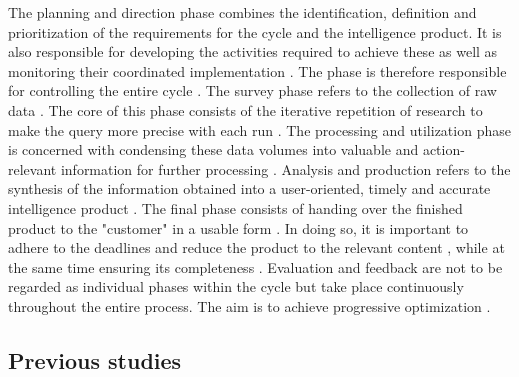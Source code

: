 \documentclass[10pt]{article}
\begin{document}
The planning and direction phase combines the identification, definition and prioritization
of the requirements for the cycle and the intelligence product. It is also responsible for
developing the activities required to achieve these \cite{DepartmentoftheArmy.2012} as well
as monitoring their coordinated implementation
\cite{JointChiefsofStaffU.S.Army.2013, DepartmentoftheArmy.2012}. The phase is therefore
responsible for controlling the entire cycle \cite{CentralIntelligenceAgency.1987}.
The survey phase refers to the collection of raw data \cite{CentralIntelligenceAgency.1987}.
The core of this phase consists of the iterative repetition of research
\cite{NorthAtlanticTreatyOrganization.2001} to make the query more precise with each run
\cite{PastorGalindo.2020}. The processing and utilization phase is concerned with condensing
these data volumes into valuable and action-relevant information for further processing
\cite{DirectorofNationalIntelligence.2011, JointChiefsofStaffU.S.Army.2013, PastorGalindo.2020, }.
Analysis and production refers to the synthesis of the information obtained into a
user-oriented, timely and accurate intelligence product
\cite{DepartmentoftheArmy.2012, Hwang.2022, NorthAtlanticTreatyOrganization.2001}.
The final phase consists of handing over the finished product to the "customer" in a
usable form \cite{CentralIntelligenceAgency.2023, DepartmentoftheArmy.2012, Williams.2018}.
In doing so, it is important to adhere to the deadlines and reduce the product to the
relevant content \cite{DepartmentoftheArmy.2012}, while at the same time ensuring its
completeness \cite{Lowenthal.2020}. Evaluation and feedback are not to be regarded as
individual phases within the cycle but take place continuously throughout the entire process.
The aim is to achieve progressive optimization
\cite{DirectorofNationalIntelligence.2011, JointChiefsofStaffU.S.Army.2013, NorthAtlanticTreatyOrganization.2001}.

\subsection{Previous studies}
\end{document}
